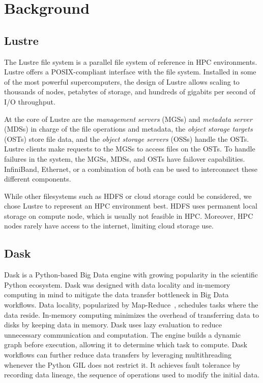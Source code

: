 \documentclass[AMA,STIX1COL]{WileyNJD-v2}
\begin{document}
			
\section{Background}
\subsection{Lustre}
The Lustre file system is a parallel file system of reference in HPC environments.
Lustre offers a POSIX-compliant interface with the file system.
Installed in some of the most powerful supercomputers, the design of Lustre allows
scaling to thousands of nodes, petabytes of storage, and hundreds of gigabits per second of I/O throughput.
				
At the core of Lustre are the \textit{management servers} (MGSs) and \textit{metadata server} (MDSs) in charge of the file operations and metadata,
the \textit{object storage targets} (OSTs) store file data, and the \textit{object storage servers} (OSSs) handle the OSTs.
Lustre clients make requests to the MGSs to access files on the OSTs.
To handle failures in the system, the MGSs, MDSs, and OSTs have failover capabilities.
InfiniBand, Ethernet, or a combination of both can be used to interconnect these different components.
				
While other filesystems such as HDFS or cloud storage could be considered, we chose Lustre to represent an HPC environment best.
HDFS uses permanent local storage on compute node, which is usually not feasible in HPC.
Moreover, HPC nodes rarely have access to the internet, limiting cloud storage use.
				
\subsection{Dask}
Dask is a Python-based Big Data engine with growing popularity in the scientific Python ecosystem.
Dask was designed with data locality and in-memory computing in mind to mitigate the data transfer bottleneck in Big Data workflows.
Data locality, popularized by Map-Reduce~\cite{dean2008mapreduce}, schedules tasks where the data reside.
In-memory computing minimizes the overhead of transferring data to disks by keeping data in memory.
Dask uses lazy evaluation to reduce unnecessary communication and computation.
The engine builds a dynamic graph before execution, allowing it to determine which task to compute.
Dask workflows can further reduce data transfers by leveraging multithreading whenever the Python GIL does not restrict it.
It achieves fault tolerance by recording data lineage, the sequence of operations used to modify the initial data.
				
\end{document}
